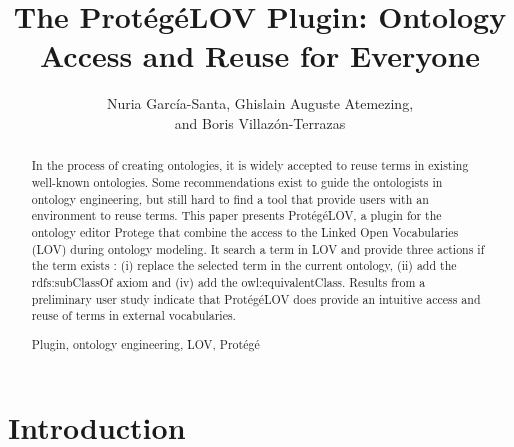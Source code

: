 \documentclass[runningheads,a4paper]{llncs}
\newcommand{\keywords}[1]{\par\addvspace\baselineskip
\noindent\keywordname\enspace\ignorespaces#1}
\begin{document}

\title{The Prot{\'e}g{\'e}LOV Plugin: Ontology Access and Reuse for Everyone }


\author{ Nuria Garc\'ia-Santa, Ghislain Auguste Atemezing,\\ and Boris Villaz{\'o}n-Terrazas}


\maketitle


\begin{abstract}

In the process of creating ontologies, it is widely accepted to reuse terms in existing well-known ontologies. Some recommendations exist to guide the ontologists in ontology engineering, but still hard to find a tool that provide users with an environment to reuse terms. This paper presents Prot{\'e}g{\'e}LOV, a plugin for the ontology editor Protege that combine the access to the Linked Open Vocabularies (LOV) during ontology modeling. It search a term in LOV and provide three actions if the term exists : (i) replace the selected term in the current ontology, (ii) add the rdfs:subClassOf axiom and (iv) add the owl:equivalentClass. Results from a preliminary user study indicate that Prot{\'e}g{\'e}LOV does provide an intuitive access and reuse of terms in external vocabularies.

\keywords{Plugin, ontology engineering, LOV, Prot{\'e}g{\'e}} 
\end{abstract}


\section{Introduction}\label{sec:introduction}

\end{document}
